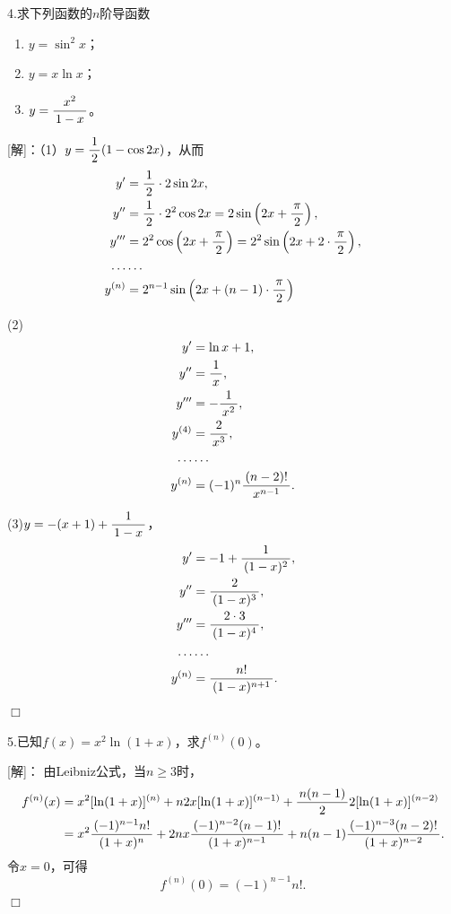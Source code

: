 \bigskip

4.求下列函数的$n$阶导函数
  \begin{enumerate}[(1)]
    \setlength{\itemindent}{1cm}
    \item $y=\sin^2x$；
    \item $y=x\ln x$；
    \item $y=\df{x^2}{1-x}$。
  \end{enumerate}
  
[解]：（1）$y=\df12(1-\cos2x)$，从而
\begin{align*}
	y'&=\df12\cdot 2\sin2x,\\
	y''&=\df12\cdot 2^2\cos2x=2\sin\left(2x+\df{\pi}2\right),\\
	y'''&=2^2\cos\left(2x+\df{\pi}2\right)=2^2\sin\left(2x+2\cdot\df{\pi}2\right),\\
	\ldots&\ldots\\
	y^{(n)}&=2^{n-1}\sin\left(2x+(n-1)\cdot\df{\pi}2\right)
\end{align*}

(2)
\begin{align*}
	y'&=\ln x+1,\\
	y''&=\df1x,\\
	y'''&=-\df1{x^2},\\
	y^{(4)}&=\df2{x^3},\\
	\ldots&\ldots\\
	y^{(n)}&=(-1)^n\df{(n-2)!}{x^{n-1}}.
\end{align*}

(3)$y=-(x+1)+\df1{1-x}$，
\begin{align*}
	y'&=-1+\df1{(1-x)^2},\\
	y''&=\df2{(1-x)^3},\\
	y'''&=\df{2\cdot 3}{(1-x)^4},\\
	\ldots&\ldots\\
	y^{(n)}&=\df{n!}{(1-x)^{n+1}}.
\end{align*}
\hfill$\Box$

\bigskip

5.已知$f(x)=x^2\ln(1+x)$，求$f^{(n)}(0)$。

[解]：
由Leibniz公式，当$n\geq3$时，
\begin{align*}
	f^{(n)}(x)&=x^2[\ln(1+x)]^{(n)}+n2x[\ln(1+x)]^{(n-1)}
	+\df{n(n-1)}22[\ln(1+x)]^{(n-2)}\\
	&=x^2\df{(-1)^{n-1}n!}{(1+x)^n}+2nx\df{(-1)^{n-2}(n-1)!}{(1+x)^{n-1}}
	+n(n-1)\df{(-1)^{n-3}(n-2)!}{(1+x)^{n-2}}.
\end{align*}
令$x=0$，可得
$$f^{(n)}(0)=(-1)^{n-1}n!.$$
\hfill$\Box$

